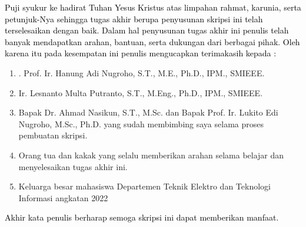 \textcolor{black}{
Puji syukur ke hadirat Tuhan Yesus Kristus atas limpahan rahmat, karunia, serta petunjuk-Nya sehingga tugas akhir berupa penyusunan skripsi ini telah terselesaikan dengan baik. Dalam hal penyusunan tugas akhir ini penulis telah banyak mendapatkan arahan, bantuan, serta dukungan dari berbagai pihak. Oleh karena itu pada kesempatan ini penulis mengucapkan terimakasih kepada :}


\begin{enumerate}
	\item . Prof. Ir. Hanung Adi Nugroho, S.T., M.E., Ph.D., IPM., SMIEEE.
	
	\item Ir. Lesnanto Multa Putranto, S.T., M.Eng., Ph.D., IPM., SMIEEE.
		
	\item Bapak Dr. Ahmad Nasikun, S.T., M.Sc. dan Bapak Prof. Ir. Lukito Edi Nugroho, M.Sc., Ph.D. yang
sudah membimbing saya selama proses pembuatan skripsi.

	\item Orang tua dan kakak yang selalu memberikan arahan selama belajar dan menyelesaikan tugas akhir ini.
	
	\item  Keluarga besar mahasiswa Departemen Teknik Elektro dan Teknologi Informasi angkatan 2022

\end{enumerate}

\textcolor{black}{Akhir kata penulis berharap semoga skripsi ini dapat memberikan manfaat.}

\noindent\textcolor{red}{}

